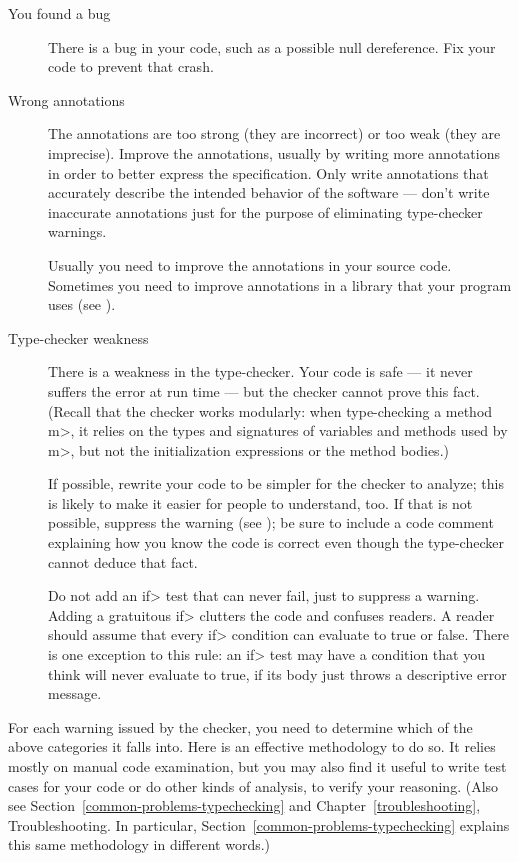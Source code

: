 \begin{description}
\item[You found a bug]
  There is a bug in your code, such as a possible null dereference.  Fix
  your code to prevent that crash.

\item[Wrong annotations]
  The annotations are too strong (they are incorrect) or too weak (they
  are imprecise).  Improve the
  annotations, usually by writing more annotations in order to better
  express the specification.
  Only write annotations that accurately describe the intended behavior of
  the software --- don't write inaccurate annotations just for the purpose
  of eliminating type-checker warnings.

  Usually you need to improve the annotations in your source code.
  Sometimes you need to improve annotations in a library that your program
  uses (see ).

\item[Type-checker weakness]
  There is a weakness in the type-checker.  Your code is safe --- it never
  suffers the error at run time --- but the checker cannot prove this fact.
  (Recall that the checker works modularly:  when type-checking a
  method \<m>, it relies on the types and signatures of variables and
  methods used by \<m>, but not the initialization expressions or the
  method bodies.)

  If possible, rewrite your code to be simpler for the checker to analyze;
  this is likely to make it easier for people to understand, too.
  If that is not possible, suppress the warning (see
  ); be sure to include a code
  comment explaining how you know the code is correct even though the
  type-checker cannot deduce that fact.

  Do not add an \<if> test that can never fail, just to suppress a
  warning.  Adding a gratuitous \<if> clutters the code and confuses
  readers.  A reader should assume that every \<if> condition can evaluate to true
  or false.  There is one exception to this rule:  an \<if> test may have a
  condition that you think will never evaluate to true, if its body just throws a
  descriptive error message.
\end{description}

For each warning issued by the checker, you need to determine which of the
above categories it falls into.  Here is an effective methodology to do so.
It relies mostly on manual code examination, but you may also find it
useful to write test cases for your code or do other kinds of analysis, to
verify your reasoning.
(Also see
Section~\ref{common-problems-typechecking} and
Chapter~\ref{troubleshooting}, Troubleshooting.
In particular, Section~\ref{common-problems-typechecking} explains this
same methodology in different words.)


